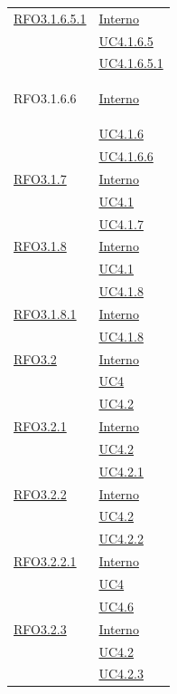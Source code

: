 \begin{longtable}{|>{\centering}m{5cm}|m{5cm}<{\centering}|}
\hyperlink{RFO3.1.6.5.1}{RFO3.1.6.5.1} & \hyperlink{Interno}{Interno}\\
& \hyperref[UC4.1.6.5]{UC4.1.6.5}\\
& \hyperref[UC4.1.6.5.1]{UC4.1.6.5.1}\\ \hline

\hypertarget{RFO3.1.6.6}{RFO3.1.6.6} & \hyperlink{Interno}{Interno}\\
& \hyperref[UC4.1.6]{UC4.1.6}\\
& \hyperref[UC4.1.6.6]{UC4.1.6.6}\\ \hline

\hyperlink{RFO3.1.7}{RFO3.1.7} & \hyperlink{Interno}{Interno}\\
& \hyperref[UC4.1]{UC4.1}\\
& \hyperref[UC4.1.7]{UC4.1.7}\\ \hline

\hyperlink{RFO3.1.8}{RFO3.1.8} & \hyperlink{Interno}{Interno}\\
& \hyperref[UC4.1]{UC4.1}\\
& \hyperref[UC4.1.8]{UC4.1.8}\\ \hline

\hyperlink{RFO3.1.8.1}{RFO3.1.8.1} & \hyperlink{Interno}{Interno}\\
& \hyperref[UC4.1.8]{UC4.1.8}\\ \hline

\hyperlink{RFO3.2}{RFO3.2} & \hyperlink{Interno}{Interno}\\
& \hyperref[UC4]{UC4}\\
& \hyperref[UC4.2]{UC4.2}\\ \hline

\hyperlink{RFO3.2.1}{RFO3.2.1} & \hyperlink{Interno}{Interno}\\
& \hyperref[UC4.2]{UC4.2}\\
& \hyperref[UC4.2.1]{UC4.2.1}\\ \hline

\hyperlink{RFO3.2.2}{RFO3.2.2} & \hyperlink{Interno}{Interno}\\
& \hyperref[UC4.2]{UC4.2}\\
& \hyperref[UC4.2.2]{UC4.2.2}\\ \hline

\hyperlink{RFO3.2.2.1}{RFO3.2.2.1} & \hyperlink{Interno}{Interno}\\
& \hyperref[UC4]{UC4}\\
& \hyperref[UC4.6]{UC4.6}\\ \hline

\hyperlink{RFO3.2.3}{RFO3.2.3} & \hyperlink{Interno}{Interno}\\
& \hyperref[UC4.2]{UC4.2}\\
& \hyperref[UC4.2.3]{UC4.2.3}\\ \hline


\end{longtable}
